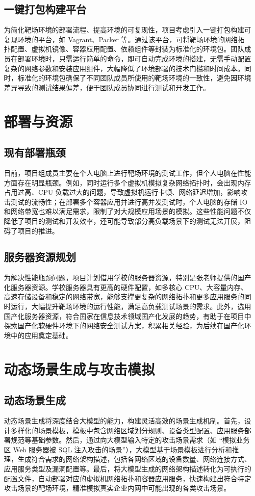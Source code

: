\documentclass[lang=cn,10pt]{elegantbook}
\begin{document}
\subsection{一键打包构建平台}
为简化靶场环境的部署流程、提高环境的可复现性，项目考虑引入一键打包构建可复现环境的平台，如 Vagrant、Packer 等。通过该平台，可将靶场环境的网络拓扑配置、虚拟机镜像、容器应用配置、依赖组件等封装为标准化的环境包。团队成员在部署环境时，只需运行简单的命令，即可自动完成环境的搭建，无需手动配置复杂的网络参数和安装应用组件，大幅降低了环境部署的技术门槛和时间成本。同时，标准化的环境包确保了不同团队成员所使用的靶场环境的一致性，避免因环境差异导致的测试结果偏差，便于团队成员协同进行测试和开发工作。

\section{部署与资源}
\subsection{现有部署瓶颈}
目前，项目组成员主要在个人电脑上进行靶场环境的测试工作，但个人电脑在性能方面存在明显瓶颈。例如，同时运行多个虚拟机模拟复杂网络拓扑时，会出现内存占用过高、CPU 负载过大的问题，导致虚拟机运行卡顿、网络延迟增加，影响攻击测试的流畅性；在部署多个容器应用并进行高并发测试时，个人电脑的存储 IO 和网络带宽也难以满足需求，限制了对大规模应用场景的模拟。这些性能问题不仅降低了项目的测试和开发效率，还可能导致部分高负载场景下的测试无法开展，阻碍了项目的推进。

\subsection{服务器资源规划}
为解决性能瓶颈问题，项目计划借用学校的服务器资源，特别是张老师提供的国产化服务器资源。学校服务器具有更高的硬件配置，如多核心 CPU、大容量内存、高速存储设备和稳定的网络带宽，能够支撑更复杂的网络拓扑和更多应用服务的同时运行，大幅提升靶场环境的运行性能，满足高负载测试场景的需求。此外，选用国产化服务器资源，符合国家在信息技术领域国产化发展的趋势，有助于在项目中探索国产化软硬件环境下的网络安全测试方案，积累相关经验，为后续在国产化环境中的应用奠定基础。

\section{动态场景生成与攻击模拟}
\subsection{动态场景生成}
动态场景生成将深度结合大模型的能力，构建灵活高效的场景生成机制。首先，设计多样化的场景模板，模板中包含网络区域划分规则、设备类型配置、应用服务部署规范等基础参数。然后，通过向大模型输入特定的攻击场景需求（如 “模拟业务区 Web 服务器被 SQL 注入攻击的场景”），大模型基于场景模板进行分析和推理，生成符合需求的网络架构描述，包括各网络区域的设备数量、网络连接方式、应用服务类型及漏洞配置等。最后，将大模型生成的网络架构描述转化为可执行的配置文件，自动部署对应的虚拟机网络拓扑和容器应用服务，快速构建出符合特定攻击场景的靶场环境，精准模拟真实企业内网中可能出现的各类攻击场景。
\end{document}
